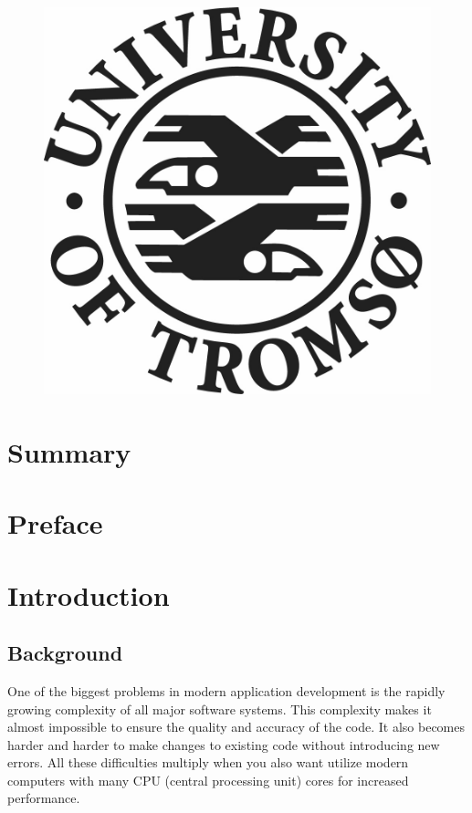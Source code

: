 \documentclass[12pt, a4paper]{article}
\begin{document}
\begin{titlepage}
\begin{figure}[!h]
\begin{minipage}[b]{0.3\textwidth}
  \end{minipage}
  \hfill
  \begin{minipage}[b]{0.3\textwidth}
    \includegraphics[width=\textwidth]{LogoEngelsk}
  \end{minipage}
\end{figure}


\end{titlepage}

\newpage



\newpage
\section*{Summary}

\newpage
\section*{Preface}

\newpage
\tableofcontents

\newpage
\section{Introduction}
\subsection{Background}
One of the biggest problems in modern application development is the rapidly growing complexity of all major software systems. This complexity makes it almost impossible to ensure the quality and accuracy of the code. It also becomes harder and harder to make changes to existing code without introducing new errors. All these difficulties multiply when you also want utilize modern computers with many CPU (central processing unit) cores for increased performance.\\
\end{document}
